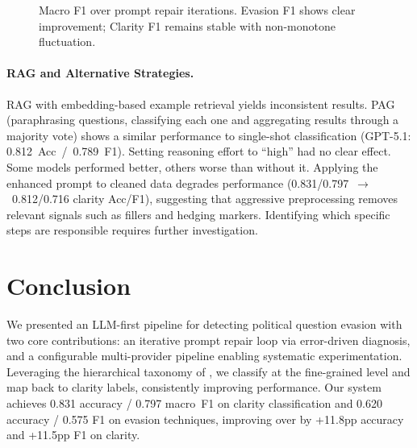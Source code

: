 \documentclass[11pt]{article}
\begin{document}
\begin{figure}[htb]
\centering
{}
\caption{Macro F1 over prompt repair iterations. Evasion F1 shows clear improvement; Clarity F1 remains stable with non-monotone fluctuation.}
\label{fig:convergence}
\end{figure}

\paragraph{RAG and Alternative Strategies.}
RAG with embedding-based example retrieval yields inconsistent results.
PAG \citep{yadav2024pag} (paraphrasing questions, classifying each one and aggregating results through a majority vote) shows a similar performance to single-shot classification (GPT-5.1: 0.812~Acc~/~0.789~F1).
Setting reasoning effort to ``high'' had no clear effect. Some models performed better, others worse than without it.
Applying the enhanced prompt to cleaned data degrades performance (0.831/0.797~$\rightarrow$~0.812/0.716 clarity Acc/F1), suggesting that aggressive preprocessing removes relevant signals such as fillers and hedging markers. Identifying which specific steps are responsible requires further investigation.

\section{Conclusion}

We presented an LLM-first pipeline for detecting political question evasion with two core contributions: an iterative prompt repair loop via error-driven diagnosis, and a configurable multi-provider pipeline enabling systematic experimentation.
Leveraging the hierarchical taxonomy of \citet{thomas2024isaidthatdataset}, we classify at the fine-grained level and map back to clarity labels, consistently improving performance.
Our system achieves 0.831 accuracy / 0.797 macro~F1 on clarity classification and 0.620 accuracy / 0.575 F1 on evasion techniques, improving over \citet{thomas2024isaidthatdataset} by +11.8pp accuracy and +11.5pp F1 on clarity.
\end{document}
